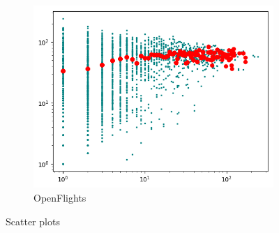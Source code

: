 \begin{figure}[h]
\begin{subfigure}[b]{0.3\textwidth}
        \includegraphics[width=\textwidth]{img/scatter_2}
        \caption*{OpenFlights}
    \end{subfigure}
    \caption{Scatter plots}
\end{figure}